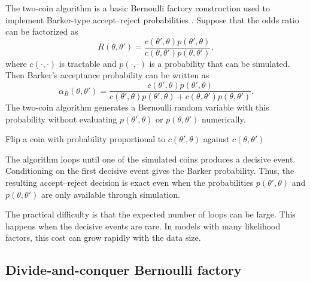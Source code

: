 The two-coin algorithm is a basic Bernoulli factory construction used to implement Barker-type accept--reject probabilities \cite{goncalves2017}.
Suppose that the odds ratio can be factorized as
\begin{equation}
R(\theta,\theta')
=
\frac{c(\theta',\theta)p(\theta',\theta)}
{c(\theta,\theta')p(\theta,\theta')},
\end{equation}
where $c(\cdot,\cdot)$ is tractable and $p(\cdot,\cdot)$ is a probability that can be simulated.
Then Barker's acceptance probability can be written as
\begin{equation}
\alpha_B(\theta,\theta')
=
\frac{c(\theta',\theta)p(\theta',\theta)}
{c(\theta',\theta)p(\theta',\theta)+c(\theta,\theta')p(\theta,\theta')}.
\end{equation}
The two-coin algorithm generates a Bernoulli random variable with this probability without evaluating $p(\theta',\theta)$ or $p(\theta,\theta')$ numerically.

\begin{algorithm}[H]
    Flip a coin with probability proportional to $c(\theta',\theta)$ against $c(\theta,\theta')$\;
    \caption{Two-coin algorithm}
    \label{alg:twocoin}
\end{algorithm}

The algorithm loops until one of the simulated coins produces a decisive event.
Conditioning on the first decisive event gives the Barker probability.
Thus, the resulting accept--reject decision is exact even when the probabilities $p(\theta',\theta)$ and $p(\theta,\theta')$ are only available through simulation.

The practical difficulty is that the expected number of loops can be large.
This happens when the decisive events are rare.
In models with many likelihood factors, this cost can grow rapidly with the data size.

\subsection{Divide-and-conquer Bernoulli factory}

